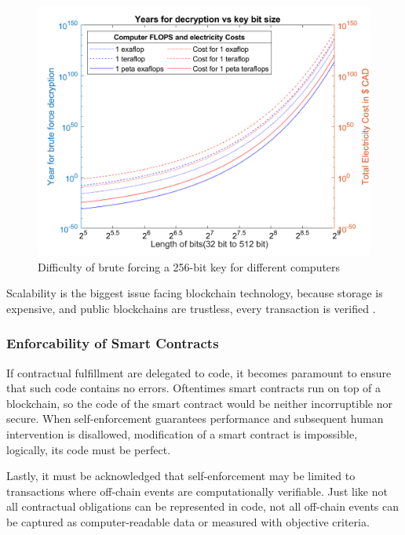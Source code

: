  	\begin{figure}[ht]
  	\centering 
  	\includegraphics[width=0.7\linewidth]{Diagrams/epicPic.png}
  	\caption{Difficulty of brute forcing a 256-bit key for different computers}
  	\label{security:fig2}
  	\end{figure}


Scalability is the biggest issue facing blockchain technology, because storage is expensive, and public blockchains are trustless, every transaction is verified \cite{EthScale:Online}. 

\subsubsection{Enforcability of Smart Contracts}



If contractual fulfillment are delegated to code, it becomes paramount to
ensure that such code contains no errors.  Oftentimes smart contracts run on top of a blockchain, so the code of the smart contract would be neither incorruptible nor secure. When self-enforcement guarantees performance and subsequent human intervention is disallowed, modification of a  smart contract is impossible, logically, its
code must be perfect. 

Lastly, it must be acknowledged that self-enforcement may be limited to transactions
where off-chain events are computationally verifiable. Just like not all contractual
obligations can be represented in code, not all off-chain events can be captured as
computer-readable data or measured with objective criteria. 


